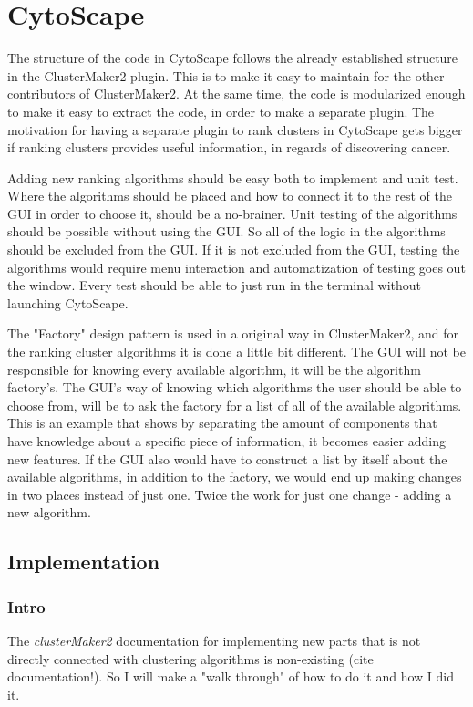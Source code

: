 \part{CytoScape} %
\label{pa:cytoscape}
The structure of the code in CytoScape follows the already established structure
in the ClusterMaker2 plugin. This is to make it easy to maintain for the other
contributors of ClusterMaker2. At the same time, the code is modularized enough
to make it easy to extract the code, in order to make a separate plugin. The
motivation for having a separate plugin to rank clusters in CytoScape gets
bigger if ranking clusters provides useful information, in regards of
discovering cancer.

Adding new ranking algorithms should be easy both to implement and unit test.
Where the algorithms should be placed and how to connect it to the rest of the
GUI in order to choose it, should be a no-brainer. Unit testing of the
algorithms should be possible without using the GUI. So all of the logic in the
algorithms should be excluded from the GUI. If it is not excluded from the GUI,
testing the algorithms would require menu interaction and automatization of
testing goes out the window. Every test should be able to just run in the
terminal without launching CytoScape.

The "Factory" design pattern %
is used in a original way in ClusterMaker2, and for the ranking cluster
algorithms it is done a little bit different.  The GUI will not be responsible
for knowing every available algorithm, it will be the algorithm factory's. The
GUI's way of knowing which algorithms the user should be able to choose from,
will be to ask the factory for a list of all of the available algorithms. This
is an example that shows by separating the amount of components that have
knowledge about a specific piece of information, it becomes easier adding new
features. If the GUI also would have to construct a list by itself about the
available algorithms, in addition to the factory, we would end up making changes
in two places instead of just one. Twice the work for just one change - adding a
new algorithm.

\chapter{Implementation}

\section{Intro}
The \textit{clusterMaker2} documentation for implementing new parts that is not
directly connected with clustering algorithms is non-existing (cite
documentation!). So I will make a "walk through" of how to do it and how I did it.

